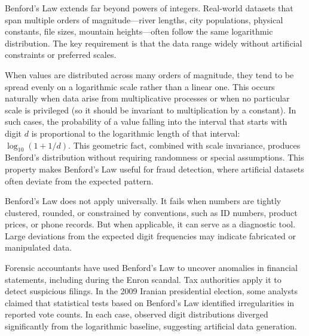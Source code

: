 Benford's Law extends far beyond powers of integers. Real-world datasets that span multiple orders of magnitude—river lengths, city populations, physical constants, file sizes, mountain heights—often follow the same logarithmic distribution. The key requirement is that the data range widely without artificial constraints or preferred scales.

When values are distributed across many orders of magnitude, they tend to be spread evenly on a logarithmic scale rather than a linear one. This occurs naturally when data arise from multiplicative processes or when no particular scale is privileged (so it should be invariant to multiplication by a constant). In such cases, the probability of a value falling into the interval that starts with digit $d$ is proportional to the logarithmic length of that interval: $\log_{10}(1 + 1/d)$. This geometric fact, combined with scale invariance, produces Benford's distribution without requiring randomness or special assumptions. This property makes Benford's Law useful for fraud detection, where artificial datasets often deviate from the expected pattern.

Benford’s Law does not apply universally. It fails when numbers are tightly clustered, rounded, or constrained by conventions, such as ID numbers, product prices, or phone records. But when applicable, it can serve as a diagnostic tool. Large deviations from the expected digit frequencies may indicate fabricated or manipulated data.

Forensic accountants have used Benford's Law to uncover anomalies in financial statements, including during the Enron scandal. Tax authorities apply it to detect suspicious filings. In the 2009 Iranian presidential election, some analysts claimed that statistical tests based on Benford's Law identified irregularities in reported vote counts. In each case, observed digit distributions diverged significantly from the logarithmic baseline, suggesting artificial data generation.

